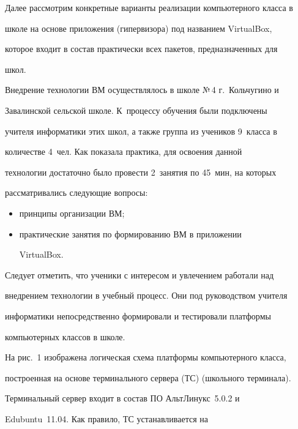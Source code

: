 Далее рассмотрим конкретные варианты реализации компьютерного класса в 


школе на основе приложения (гипервизора) под названием VirtualBox, 


которое входит в состав практически всех пакетов, предназначенных для 


школ.   





Внедрение технологии ВМ осуществлялось в школе №\,4 г.~Кольчугино и 


За\-ва\-линской сельской школе. К~процессу обучения были подключены 


учителя информатики этих школ, а также группа из учеников 9~класса в 


количестве 4~чел. Как показала практика, для освоения данной 


технологии достаточно было провести 2~занятия по 45~мин, на которых 


рассматривались следующие вопросы:


\begin{itemize}


     \item  принципы организации ВМ;


     \item практические занятия по формированию ВМ в приложении 


VirtualBox.


     \end{itemize}


     


Следует отметить, что ученики с интересом и увлечением работали над 


внед\-ре\-ни\-ем технологии в учебный процесс. Они под руководством учителя 


информатики непосредственно формировали и тестировали платформы 


компьютерных классов в школе. 





На рис.~1 изображена логическая схема платформы компьютерного класса, 


построенная на основе терминального сервера (ТС) (школьного терминала). 


Терминальный сервер входит в состав ПО АльтЛинукс~5.0.2 и 


Edubuntu~11.04. Как правило, ТС устанавливается на 


